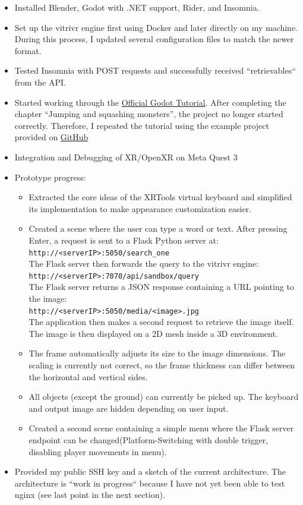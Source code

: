 \documentclass{article}
\begin{document}
\done
\begin{itemize}
    \item Installed Blender, Godot with .NET support, Rider, and Insomnia.
    \item Set up the vitrivr engine first using Docker and later directly on my machine. During this process, I updated several configuration files to match the newer format.
    \item Tested Insomnia with POST requests and successfully received ``retrievables`` from the API.
    \item Started working through the \href{https://docs.godotengine.org/en/stable/getting_started/first_3d_game/index.html}{Official Godot Tutorial}. After completing the chapter ``Jumping and squashing monsters'', the project no longer started correctly. Therefore, I repeated the tutorial using the example project provided on \href{https://github.com/godotengine/godot-demo-projects/tree/master/3d/squash_the_creeps}{GitHub}
    \item Integration and Debugging of XR/OpenXR on Meta Quest 3
    \item Prototype progress:
    \begin{itemize}
        \item Extracted the core ideas of the XRTools virtual keyboard and simplified its implementation to make appearance customization easier.
        \item Created a scene where the user can type a word or text. After pressing Enter, a request is sent to a Flask Python server at: \texttt{http://<serverIP>:5050/search\_one}\\
        The Flask server then forwards the query to the vitrivr engine:\\ \texttt{http://<serverIP>:7070/api/sandbox/query}\\
        The Flask server returns a JSON response containing a URL pointing to the image:\\ \texttt{http://<serverIP>:5050/media/<image>.jpg}\\
        The application then makes a second request to retrieve the image itself. The image is then displayed on a 2D mesh inside a 3D environment.
        \item The frame automatically adjusts its size to the image dimensions. The scaling is currently not correct, so the frame thickness can differ between the horizontal and vertical sides.
        \item All objects (except the ground) can currently be picked up. The keyboard and output image are hidden depending on user input.
        \item Created a second scene containing a simple menu where the Flask server endpoint can be changed(Platform-Switching with double trigger, disabling player movements in menu).
    \end{itemize}
    
    \item Provided my public SSH key and a sketch of the current architecture. The architecture is ``work in progress`` because I have not yet been able to test nginx (see last point in the next section).
\end{itemize}
\end{document}
